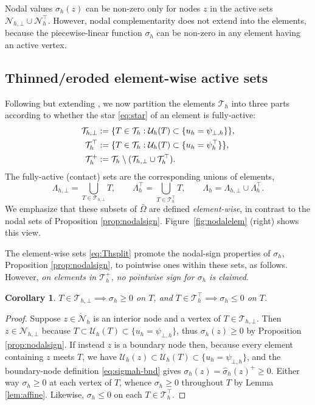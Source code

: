 \documentclass[12pt]{amsart}
\numberwithin{equation}{section}
\theoremstyle{plain}
\newtheorem{corollary}[theorem]{Corollary}
\theoremstyle{definition}
\theoremstyle{remark}
\newcommand{\psiloh}{\psi_{\bot,h}}
\newcommand{\psiuph}{\psi^\top_h}
\newcommand{\Th}{\mathcal{T}_h}
\newcommand{\Nh}{\mathcal{N}_h}
\newcommand{\Nhr}{\mathring{\mathcal{N}}_h}
\newcommand{\Uh}{\mathcal{U}_h}
\newcommand{\Thbot}{\mathcal{T}_{h,\bot}}
\newcommand{\Thtop}{\Th^\top}
\newcommand{\Thplus}{\Th^+}
\newcommand{\Nhbot}{\mathcal{N}_{h,\bot}}
\newcommand{\Nhtop}{\Nh^\top}
\newcommand{\Lamh}{\Lambda_h}
\newcommand{\Lamhbot}{\Lambda_{h,\bot}}
\newcommand{\Lamhtop}{\Lambda_h^\top}
\begin{document}
Nodal values $\sigma_h(z)$ can be non-zero only for nodes $z$ in the active sets $\Nhbot \cup \Nhtop$.  However, nodal complementarity does not extend into the elements, because the piecewise-linear function $\sigma_h$ can be non-zero in any element having an active vertex.

\subsection{Thinned/eroded element-wise active sets}  Following but extending \cite{NSV03}, we now partition the elements $\Th$ into three parts according to whether the star \eqref{eq:star} of an element is fully-active:
\begin{align}
\label{eq:Thsplit}
  \Thbot &:= \{T \in \Th : \Uh(T) \subset \{u_h = \psiloh\}\}, \\
  \Thtop &:= \{T \in \Th : \Uh(T) \subset \{u_h = \psiuph\}\}, \notag \\
  \Thplus &:= \Th \setminus (\Thbot \cup \Thtop). \notag
\end{align}
The fully-active (contact) sets are the corresponding unions of elements,
\begin{equation}
\Lamhbot = \bigcup_{T \in \Thbot} T, \qquad \Lamhtop = \bigcup_{T \in \Thtop} T, \qquad \Lamh = \Lamhbot \cup \Lamhtop.
\end{equation}
We emphasize that these subsets of $\bar\Omega$ are defined \emph{element-wise}, in contrast to the nodal sets of Proposition \ref{prop:nodalsign}.  Figure~\ref{fig:nodalelem} (right) shows this view.

The element-wise sets \eqref{eq:Thsplit} promote the nodal-sign properties of $\sigma_h$, Proposition \ref{prop:nodalsign}, to pointwise ones within these sets, as follows.   However, \emph{on elements in $\Thplus$, no pointwise sign for $\sigma_h$ is claimed}.

\begin{corollary} \label{cor:sigmahsign}
$T \in \Thbot \implies \sigma_h \ge 0$ on $T$, and $T \in \Thtop \implies \sigma_h \le 0$ on $T$.
\end{corollary}

\begin{proof}
Suppose $z\in \Nhr$ is an interior node and a vertex of $T \in \Thbot$.  Then $z \in \Nhbot$ because $T \subset \Uh(T) \subset \{u_h = \psiloh\}$, thus $\sigma_h(z) \ge 0$ by Proposition \ref{prop:nodalsign}.  If instead $z$ is a boundary node then, because every element containing $z$ meets $T$, we have $\Uh(z) \subset \Uh(T) \subset \{u_h = \psiloh\}$, and the boundary-node definition \eqref{eq:sigmah-bnd} gives $\sigma_h(z) = \hat\sigma_h(z)^+ \ge 0$.  Either way $\sigma_h \ge 0$ at each vertex of $T$, whence $\sigma_h \ge 0$ throughout $T$ by Lemma \ref{lem:affine}.  Likewise, $\sigma_h \le 0$ on each $T \in \Thtop$.
\end{proof}
\end{document}
